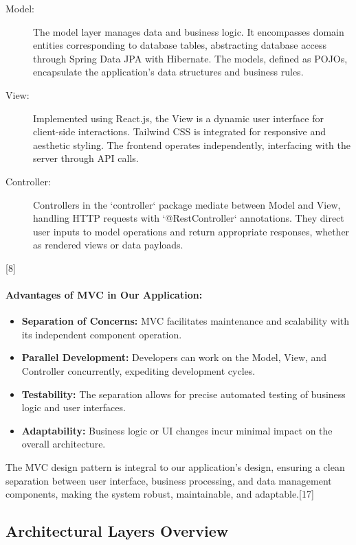 \begin{description}
  \item[Model:] The model layer manages data and business logic. It encompasses domain entities corresponding to database tables, abstracting database access through Spring Data JPA with Hibernate. The models, defined as POJOs, encapsulate the application's data structures and business rules.
  
  \item[View:] Implemented using React.js, the View is a dynamic user interface for client-side interactions. Tailwind CSS is integrated for responsive and aesthetic styling. The frontend operates independently, interfacing with the server through API calls.
  
  \item[Controller:] Controllers in the `controller` package mediate between Model and View, handling HTTP requests with `@RestController` annotations. They direct user inputs to model operations and return appropriate responses, whether as rendered views or data payloads.
\end{description}
[8]

\paragraph{Advantages of MVC in Our Application:}
\begin{itemize}
  \item \textbf{Separation of Concerns:} MVC facilitates maintenance and scalability with its independent component operation.
  \item \textbf{Parallel Development:} Developers can work on the Model, View, and Controller concurrently, expediting development cycles.
  \item \textbf{Testability:} The separation allows for precise automated testing of business logic and user interfaces.
  \item \textbf{Adaptability:} Business logic or UI changes incur minimal impact on the overall architecture.
\end{itemize}

The MVC design pattern is integral to our application's design, ensuring a clean separation between user interface, business processing, and data management components, making the system robust, maintainable, and adaptable.[17]


\subsection{Architectural Layers Overview}

